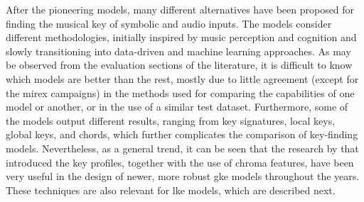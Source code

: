 After the pioneering models, many different alternatives
have been proposed for finding the musical key of symbolic
and audio inputs. The models consider different
methodologies, initially inspired by music perception and
cognition and slowly transitioning into data-driven and
machine learning approaches. As may be observed from the
evaluation sections of the literature, it is difficult to
know which models are better than the rest, mostly due to
little agreement (except for the \gls{mirex} campaigns) in
the methods used for comparing the capabilities of one model
or another, or in the use of a similar test dataset.
Furthermore, some of the models output different results,
ranging from key signatures, local keys, global keys, and
chords, which further complicates the comparison of
key-finding models. Nevertheless, as a general trend, it can
be seen that the research by \textcite{krumhansl1982tracing}
that introduced the key profiles, together with the use of
chroma features, have been very useful in the design of
newer, more robust \gls{gke} models throughout the years.
These techniques are also relevant for \gls{lke} models,
which are described next.
